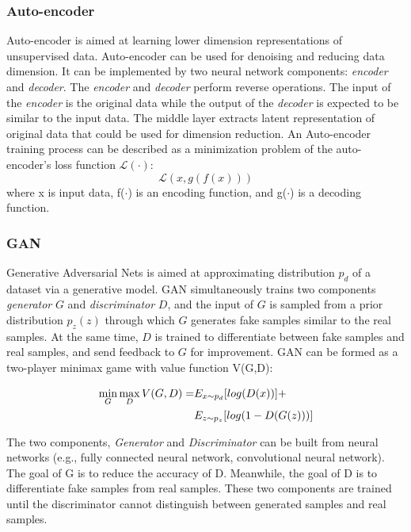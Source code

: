 \subsubsection{Auto-encoder}
Auto-encoder is aimed at learning lower dimension representations of unsupervised data. Auto-encoder can be used for denoising and reducing data dimension. It can be implemented by two neural network components: \textit{encoder} and \textit{decoder}. The \textit{encoder} and \textit{decoder} perform reverse operations. The input of the \textit{encoder} is the original data while the output of the \textit{decoder} is expected to be similar to the input data. The middle layer extracts latent representation of original data that could be used for dimension reduction. An Auto-encoder training process can be described as a minimization problem of the auto-encoder's loss function $\mathcal{L(\cdot)}$:
\begin{equation}
\mathcal{L}(x,g(f(x)))
\end{equation}
where x is input data, f($\cdot$) is an encoding function, and g($\cdot$) is a decoding function.

\subsubsection{GAN}
Generative Adversarial Nets is aimed at approximating distribution $p_d$ of a dataset via a generative model. GAN simultaneously trains two components \textit{generator} $G$ and \textit{discriminator} $D$, and the input of $G$ is sampled from a prior distribution $p_z(z)$ through which $G$ generates fake samples similar to the real samples. At the same time, $D$ is trained to differentiate between fake samples and real samples, and send feedback to $G$ for improvement. GAN can be formed as a two-player minimax game with value function V(G,D):

\begin{equation}
	\begin{split}
		\min_G \max_D{V(G,D)} = & E_{x \sim p_d} [log(D(x))] + \\& E_{z\sim p_z }[log( 1 - D( G(z) ))]
	\end{split}
\end{equation}

The two components, \textit{Generator} and \textit{Discriminator} can be built from neural networks (e.g., fully connected neural network, convolutional neural network). The goal of G is to reduce the accuracy of D. Meanwhile, the goal of D is to differentiate fake samples from real samples. These two components are trained until the discriminator cannot distinguish between generated samples and real samples.


